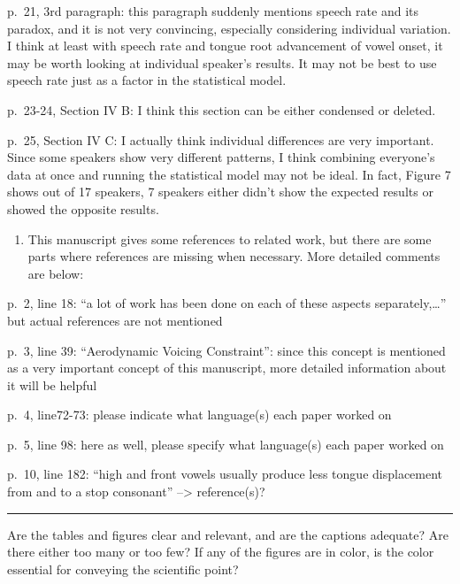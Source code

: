 \documentclass[]{article}
\providecommand{\tightlist}{%
  \setlength{\itemsep}{0pt}\setlength{\parskip}{0pt}}
\begin{document}
p.~21, 3rd paragraph: this paragraph suddenly mentions speech rate and
its paradox, and it is not very convincing, especially considering
individual variation. I think at least with speech rate and tongue root
advancement of vowel onset, it may be worth looking at individual
speaker's results. It may not be best to use speech rate just as a
factor in the statistical model.

p.~23-24, Section IV B: I think this section can be either condensed or
deleted.

p.~25, Section IV C: I actually think individual differences are very
important. Since some speakers show very different patterns, I think
combining everyone's data at once and running the statistical model may
not be ideal. In fact, Figure 7 shows out of 17 speakers, 7 speakers
either didn't show the expected results or showed the opposite results.

\begin{enumerate}
\def\labelenumi{\arabic{enumi}.}
\setcounter{enumi}{1}
\tightlist
\item
  This manuscript gives some references to related work, but there are
  some parts where references are missing when necessary. More detailed
  comments are below:
\end{enumerate}

p.~2, line 18: ``a lot of work has been done on each of these aspects
separately,\ldots{}'' but actual references are not mentioned

p.~3, line 39: ``Aerodynamic Voicing Constraint'': since this concept is
mentioned as a very important concept of this manuscript, more detailed
information about it will be helpful

p.~4, line72-73: please indicate what language(s) each paper worked on

p.~5, line 98: here as well, please specify what language(s) each paper
worked on

p.~10, line 182: ``high and front vowels usually produce less tongue
displacement from and to a stop consonant'' --\textgreater{}
reference(s)?

\par

\noindent

\rule{\textwidth}{0.4pt}

Are the tables and figures clear and relevant, and are the captions
adequate? Are there either too many or too few? If any of the figures
are in color, is the color essential for conveying the scientific point?
\end{document}
